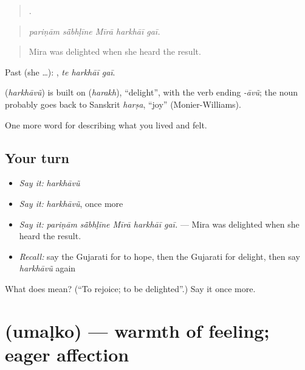 \begin{quote}
    .
\end{quote}

\begin{quote}
\emph{pariṇām sā̃bhḷīne Mīrā harkhāī gaī.}
\end{quote}

\begin{quote}
Mira was delighted when she heard the result.
\end{quote}

Past (she …):   , \emph{te harkhāī gaī}.

\begin{cousinweb}
\textbf{} (\emph{harkhāvũ}) is built on \textbf{} (\emph{harakh}), \textquotedblleft{}delight\textquotedblright{}, with the verb ending \emph{-āvũ}; the noun probably goes back to Sanskrit \emph{harṣa}, \textquotedblleft{}joy\textquotedblright{} (Monier-Williams).
\end{cousinweb}

\begin{grammarlens}[title={What you've built}]
One more word for describing what you lived and felt.
\end{grammarlens}

\subsection*{Your turn}
\begin{itemize}
\raggedright
  \item \emph{Say it:} \emph{harkhāvũ}
  \item \emph{Say it:} \emph{harkhāvũ}, once more
  \item \emph{Say it:} \emph{pariṇām sā̃bhḷīne Mīrā harkhāī gaī.} — Mira was delighted when she heard the result.
  \item \emph{Recall:} say the Gujarati for to hope, then the Gujarati for delight, then say \emph{harkhāvũ} again
\end{itemize}

\begin{tcolorbox}[breakable,colback=teal!4,colframe=teal!35!black,title={Before you move on}]
What does  mean? (\textquotedblleft{}To rejoice; to be delighted\textquotedblright{}.) Say it once more.
\end{tcolorbox}
\section[\texorpdfstring{\gu{ઉમળકો} (umaḷko)}{ઉમળકો (umaḷko)}]{ (umaḷko) — warmth of feeling; eager affection}

